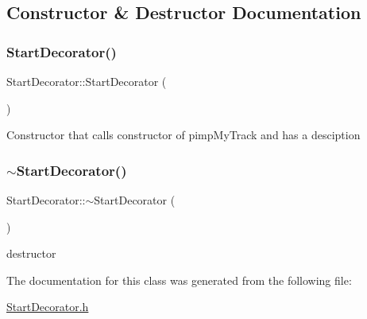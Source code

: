 \subsection{Constructor \& Destructor Documentation}
\mbox{\label{class_start_decorator_aca165ccf1bf8ad0eb0e1ea487216f4bb}} 
\subsubsection{\texorpdfstring{Start\+Decorator()}{StartDecorator()}}
{\footnotesize\ttfamily Start\+Decorator\+::\+Start\+Decorator (\begin{DoxyParamCaption}{ }\end{DoxyParamCaption})\hspace{0.3cm}{\ttfamily [inline]}}

Constructor that calls constructor of pimp\+My\+Track and has a desciption \mbox{\label{class_start_decorator_ab01d2430cb37d140c13c38374e24660e}} 
\subsubsection{\texorpdfstring{$\sim$\+Start\+Decorator()}{~StartDecorator()}}
{\footnotesize\ttfamily Start\+Decorator\+::$\sim$\+Start\+Decorator (\begin{DoxyParamCaption}{ }\end{DoxyParamCaption})\hspace{0.3cm}{\ttfamily [inline]}}

destructor 

The documentation for this class was generated from the following file\+:\begin{DoxyCompactItemize}
\item 
\mbox{\hyperlink{_start_decorator_8h}{Start\+Decorator.\+h}}\end{DoxyCompactItemize}
